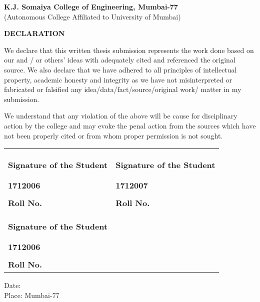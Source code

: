 \newpage
    \begin{center}
    
        \vspace*{-1cm}
        \large
        \textbf{K.J. Somaiya College of Engineering, Mumbai-77}\\
        \normalsize
        (Autonomous College Affiliated to University of Mumbai)\\
        
        \vspace{0.8cm}
        
        \large
        \textbf{DECLARATION}\\
        \vspace{0.5cm}
        
    \end{center}
\noindent
{We declare that this written thesis submission represents the work done based on our and / or others’ ideas with adequately cited and referenced the original source. We also declare that we have adhered to all principles of intellectual property, academic honesty and integrity as we have not misinterpreted or fabricated or falsified any idea/data/fact/source/original work/ matter in my submission. \par

We understand that any violation of the above will be cause for disciplinary action by the college and may evoke the penal action from the sources which have not been properly cited or from whom proper permission is not sought.}

\begin{table}[h]
\centering
\begin{tabular}{| X | X |}
\hline
 & \\
 & \\
\hrulefill & \hrulefill \\
\textbf{Signature of the Student} & \textbf{Signature of the Student} \\
\vspace{4cm} & \vspace{4cm} \\
 & \\
\textbf{1712006} & \textbf{1712007} \\
\hrulefill & \hrulefill \\
\textbf{Roll No.} & \textbf{Roll No.} \\
\hline
 & \\
 & \\
\hrulefill & \\
\textbf{Signature of the Student} & \\
\vspace{4cm} & \\
 & \\
\textbf{1712006} &  \\
\hrulefill &  \\
\textbf{Roll No.} & \\
\hline
\end{tabular}
\end{table}


\noindent
{\large Date:}\\
{\large Place: Mumbai-77}
